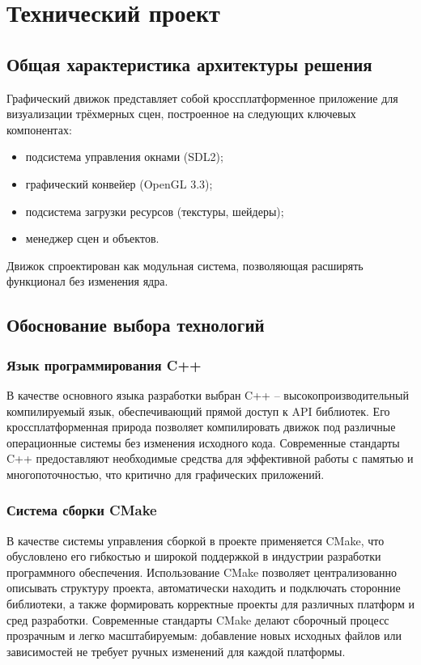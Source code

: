 \section{Технический проект}
\subsection{Общая характеристика архитектуры решения}

Графический движок представляет собой кроссплатформенное приложение для визуализации трёхмерных сцен, построенное на следующих ключевых компонентах:

\begin{itemize}
    \item подсистема управления окнами (SDL2);
    \item графический конвейер (OpenGL 3.3);
    \item подсистема загрузки ресурсов (текстуры, шейдеры);
    \item менеджер сцен и объектов.
\end{itemize}

Движок спроектирован как модульная система, позволяющая расширять функционал без изменения ядра.

\subsection{Обоснование выбора технологий}

\subsubsection{Язык программирования C++}

В качестве основного языка разработки выбран C++ -- высокопроизводительный компилируемый язык, обеспечивающий прямой доступ к API библиотек. Его кроссплатформенная природа позволяет компилировать движок под различные операционные системы без изменения исходного кода. Современные стандарты C++ предоставляют необходимые средства для эффективной работы с памятью и многопоточностью, что критично для графических приложений.

\subsubsection{Система сборки CMake}

В качестве системы управления сборкой в проекте применяется CMake, что обусловлено его гибкостью и широкой поддержкой в индустрии разработки программного обеспечения. Использование CMake позволяет централизованно описывать структуру проекта, автоматически находить и подключать сторонние библиотеки, а также формировать корректные проекты для различных платформ и сред разработки. Современные стандарты CMake делают сборочный процесс прозрачным и легко масштабируемым: добавление новых исходных файлов или зависимостей не требует ручных изменений для каждой платформы.

